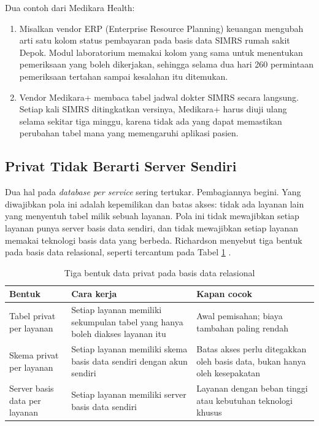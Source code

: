 Dua contoh dari Medikara Health:
\begin{enumerate}
  \item Misalkan vendor ERP (Enterprise Resource Planning) keuangan mengubah arti satu kolom status
        pembayaran pada basis data SIMRS rumah sakit Depok. Modul laboratorium memakai kolom yang
        sama untuk menentukan pemeriksaan yang boleh dikerjakan, sehingga selama dua hari 260 permintaan
        pemeriksaan tertahan sampai kesalahan itu ditemukan.
  \item Vendor Medikara+ membaca tabel jadwal dokter SIMRS secara langsung. Setiap kali SIMRS
        ditingkatkan versinya, Medikara+ harus diuji ulang selama sekitar tiga minggu, karena tidak
        ada yang dapat memastikan perubahan tabel mana yang memengaruhi aplikasi pasien.
\end{enumerate}

\subsection{Privat Tidak Berarti Server Sendiri}

Dua hal pada \textit{database per service} sering tertukar. Pembagiannya begini. Yang diwajibkan
pola ini adalah kepemilikan dan batas akses: tidak ada layanan lain yang menyentuh tabel milik
sebuah layanan. Pola ini tidak mewajibkan setiap layanan punya server basis data sendiri, dan tidak
mewajibkan setiap layanan memakai teknologi basis data yang berbeda. Richardson menyebut tiga bentuk
pada basis data relasional, seperti tercantum pada Tabel \ref{tab:ch10-bentuk-privat}
\cite{c10-richardson-dbps}.

\begin{table}[!htb]
  \centering
  \caption{Tiga bentuk data privat pada basis data relasional}
  \label{tab:ch10-bentuk-privat}
  \footnotesize
  \begin{tabularx}{\textwidth}{>{\raggedright\arraybackslash}p{2.6cm} >{\raggedright\arraybackslash}X >{\raggedright\arraybackslash}X}
    \hline
    \textbf{Bentuk} & \textbf{Cara kerja} & \textbf{Kapan cocok} \\ \hline
    Tabel privat per layanan & Setiap layanan memiliki sekumpulan tabel yang hanya boleh diakses
      layanan itu & Awal pemisahan; biaya tambahan paling rendah \\ \hline
    Skema privat per layanan & Setiap layanan memiliki skema basis data sendiri dengan akun
      sendiri & Batas akses perlu ditegakkan oleh basis data, bukan hanya oleh kesepakatan \\ \hline
    Server basis data per layanan & Setiap layanan memiliki server basis data sendiri & Layanan
      dengan beban tinggi atau kebutuhan teknologi khusus \\ \hline
  \end{tabularx}
\end{table}


